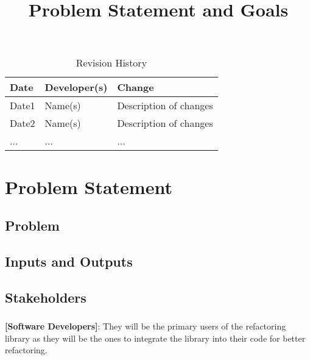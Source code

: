 \documentclass{article}
\title{Problem Statement and Goals\\\progname}
\author{\authname}
\date{}
\begin{document}
\maketitle

\begin{table}[hp]
  \caption{Revision History} \label{TblRevisionHistory}
  \begin{tabularx}{\textwidth}{llX}
    \toprule
    \textbf{Date} & \textbf{Developer(s)} & \textbf{Change}\\
    \midrule
    Date1 & Name(s) & Description of changes\\
    Date2 & Name(s) & Description of changes\\
    ... & ... & ...\\
    \bottomrule
  \end{tabularx}
\end{table}

\section{Problem Statement}



\subsection{Problem}

\subsection{Inputs and Outputs}


\subsection{Stakeholders}
\subsubsection*{\color{blue}{Direct Stakeholders}}
\textbf{[Software Developers]}: They will be the primary users of the refactoring library as they will be the ones to integrate the library into their code for better refactoring.\\
\end{document}
